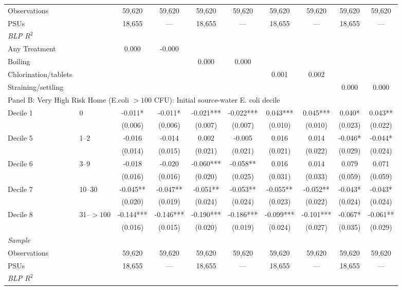 \begin{landscape}
\begin{table}[p]
\begin{adjustbox}{max width=\linewidth, center}
\begin{tabular}{llcccccccc}
\quad Observations &  & 59,620 & 59,620 & 59,620 & 59,620 & 59,620 & 59,620 & 59,620 & 59,620 \\
\quad PSUs &  & 18,655 & --- & 18,655 & --- & 18,655 & --- & 18,655 & --- \\
\multicolumn{10}{l}{\textit{BLP $R^{2}$}} \\
\quad Any Treatment &  & 0.000 & -0.000 &  &  &  &  &  &  \\
\quad Boiling &  &  &  & 0.000 & 0.000 &  &  &  &  \\
\quad Chlorination/tablets &  &  &  &  &  & 0.001 & 0.002 &  &  \\
\quad Straining/settling &  &  &  &  &  &  &  & 0.000 & 0.000 \\
\midrule
\multicolumn{10}{l}{Panel B: Very High Risk Home (E.coli $>100$ CFU): Initial source-water E. coli decile} \\
Decile 1 & 0 & -0.011* & -0.011* & -0.021*** & -0.022*** & 0.043*** & 0.045*** & 0.040* & 0.043** \\
 &  & (0.006) & (0.006) & (0.007) & (0.007) & (0.010) & (0.010) & (0.023) & (0.022) \\
Decile 5 & 1--2 & -0.016 & -0.014 & 0.002 & -0.005 & 0.016 & 0.014 & -0.046* & -0.044* \\
 &  & (0.014) & (0.015) & (0.021) & (0.021) & (0.021) & (0.022) & (0.029) & (0.024) \\
Decile 6 & 3--9 & -0.018 & -0.020 & -0.060*** & -0.058** & 0.016 & 0.014 & 0.079 & 0.071 \\
 &  & (0.016) & (0.016) & (0.020) & (0.025) & (0.031) & (0.033) & (0.059) & (0.059) \\
Decile 7 & 10--30 & -0.045** & -0.047** & -0.051** & -0.053** & -0.055** & -0.052** & -0.043* & -0.043* \\
 &  & (0.020) & (0.019) & (0.024) & (0.024) & (0.023) & (0.022) & (0.024) & (0.024) \\
Decile 8 & 31--$>100$ & -0.144*** & -0.146*** & -0.190*** & -0.186*** & -0.099*** & -0.101*** & -0.067* & -0.061** \\
 &  & (0.016) & (0.015) & (0.020) & (0.019) & (0.024) & (0.027) & (0.035) & (0.029) \\
\multicolumn{10}{l}{\textit{Sample}} \\
\quad Observations &  & 59,620 & 59,620 & 59,620 & 59,620 & 59,620 & 59,620 & 59,620 & 59,620 \\
\quad PSUs &  & 18,655 & --- & 18,655 & --- & 18,655 & --- & 18,655 & --- \\
\multicolumn{10}{l}{\textit{BLP $R^{2}$}} \\

\end{tabular}
\end{adjustbox}
\end{table}
\end{landscape}

